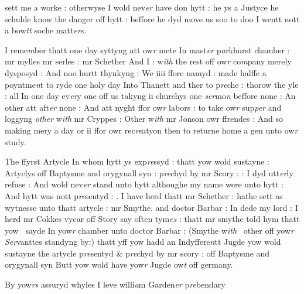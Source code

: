 \documentclass[12pt, a4paper]{book}
\begin{document}
		\ifthenelse{\isodd{\thepage}}
		{\reversemarginpar}
		{\normalmarginpar}
		sett me a worke : otherwyse I wold nev\textit{er} have don hytt : he ys a Justyce he schulde know the danger off hytt : beffore he dyd move us soo to doo I wentt nott a bow\textit{tt} soche matt\textit{er}s. 
      				
		\ifthenelse{\isodd{\thepage}}
		{\reversemarginpar}
		{\normalmarginpar}
		I reme\textit{m}ber thatt one day syttyng att ow\textit{r} mete In mast\textit{er} p\textit{ar}khurst chamber : mr mylles mr serles : mr Schether And I : w\textit{ith} the rest off ow\textit{r} co\textit{m}pany merely dysposyd : And noo hurtt thynkyng : We iiii ffore namyd : made halffe a poyntme\textit{n}t to ryde one holy day Into Thanett and ther to p\textit{re}che : thorow the yle : all In one day ev\textit{er}y one off us takyng ii churchys one \textit{ser}mo\textit{n} beffore none : An other att aft\textit{er }none : And att nyght ffor ow\textit{r} labors : to take  ow\textit{r} sup\textit{per} and loggyng \textit{other} w\textit{ith} mr Cryppes : Other w\textit{ith} mr Jonson owr ffrendes : And so making mery a day or ii ffor owr rec\textit{re}atyon then to returne home a gen unto ow\textit{r} study.
      				
		\ifthenelse{\isodd{\thepage}}
		{\reversemarginpar}
		{\normalmarginpar}
		The ffyrst Artycle In whom hytt ys exp\textit{re}ssyd : thatt yow wold sustayne : Artyclys off Baptysme and orygynall syn : p\textit{re}chyd by mr Scory : : I dyd utt\textit{er}ly refuse : And wold nev\textit{er} stand unto hytt althoughe my name were unto hytt : And hytt was nott p\textit{re}sentyd : . I have herd thatt mr Schether : hathe sett as wytnesse unto thatt artycle : mr Smythe. and doctor Barbar : In dede my lord : I herd mr Cokkes vycar off Story say often tym\textit{es} : thatt mr smythe told hym 
			thatt yow  sayde In yow\textit{r} chamber unto doctor Barbar : (Smythe w\textit{ith}  other off yow\textit{r}
      					\textit{Ser}vanttes standyng by:) thatt yff yow hadd an Indyffere\textit{n}tt Jugde yow wold sustayne the artycle p\textit{re}sentyd \& p\textit{re}chyd by mr scory : off Baptysme and orygynall syn Butt yow wold have yow\textit{r }Jugde ow\textit{t} off germany.
      				
		\ifthenelse{\isodd{\thepage}}
		{\reversemarginpar}
		{\normalmarginpar}
		By yow\textit{rs} assuryd whyles I leve willi\textit{a}m Garden\textit{er} p\textit{re}bendary
      				
\dotfill
						\newpage
{}
\end{document}
